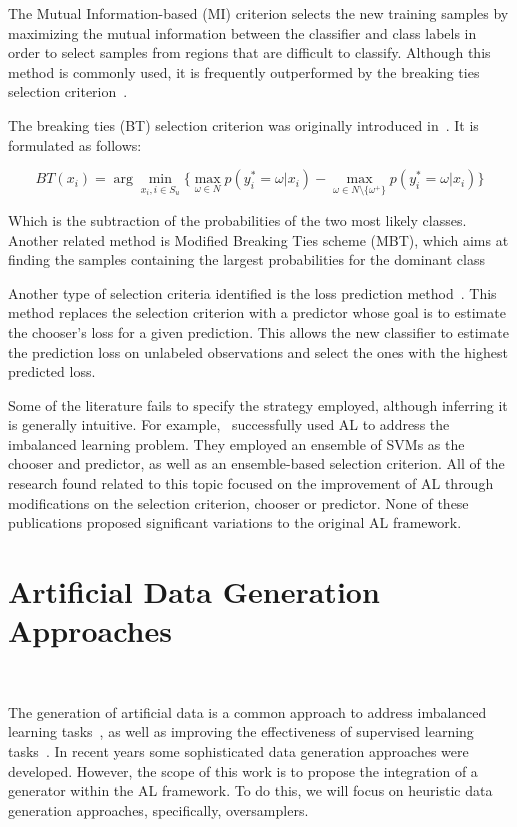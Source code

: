 \documentclass[parskip=full]{scrartcl}
\begin{document}
The Mutual Information-based (MI) criterion selects the new training samples by
maximizing the mutual information between the classifier and class labels in
order to select samples from regions that are difficult to classify. Although
this method is commonly used, it is frequently outperformed by the breaking
ties selection criterion~\cite{Li2011,Liu2018}.

The breaking ties (BT) selection criterion was originally introduced
in~\cite{Luo2003}. It is formulated as follows:

\begin{equation}\label{eq:breaking_ties}
    BT(x_i) = \arg \min_{x_i, i \in S_u}\{ \max_{\omega \in N}{p(y_{i}^{*}=\omega|x_i)} -
    \max_{\omega \in N\setminus\{\omega^{+}\}}{p(y_{i}^{*}=\omega|x_i)}\}
\end{equation}

Which is the subtraction of the probabilities of the two most likely classes.
Another related method is Modified Breaking Ties scheme (MBT), which aims at
finding the samples containing the largest probabilities for the dominant
class~\cite{Liu2018,Li2013a}

Another type of selection criteria identified is the loss prediction
method~\cite{Yoo2019}. This method replaces the selection criterion with a
predictor whose goal is to estimate the chooser's loss for a given
prediction. This allows the new classifier to estimate the prediction loss on
unlabeled observations and select the ones with the highest predicted loss.

Some of the literature fails to specify the strategy employed, although
inferring it is generally intuitive. For example,~\cite{Ertekin2007}
successfully used AL to address the imbalanced learning problem. They employed
an ensemble of SVMs as the chooser and predictor, as well as an ensemble-based
selection criterion. All of the research found related to this topic focused on
the improvement of AL through modifications on the selection criterion, chooser
or predictor. None of these publications proposed significant variations to the
original AL framework.

\section{Artificial Data Generation Approaches}~\label{sec:ovs-sota}

The generation of artificial data is a common approach to address imbalanced
learning tasks~\cite{Kaur2019}, as well as improving the effectiveness of
supervised learning tasks~\cite{DeVries2017}. In recent years some
sophisticated data generation approaches were developed. However, the scope of
this work is to propose the integration of a generator within the AL
framework. To do this, we will focus on heuristic data generation approaches,
specifically, oversamplers.
\end{document}
